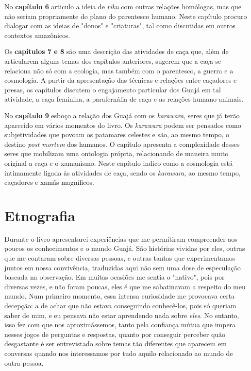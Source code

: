 No \textbf{capítulo 6} articulo a ideia de \emph{riku} com outras relações homólogas, mas que não seriam
propriamente do plano do parentesco humano. Neste capítulo procuro
dialogar com as ideias de "donos" e "criaturas", tal como discutidas em
outros contextos amazônicos.

Os \textbf{capítulos 7 e 8} são uma descrição das atividades de caça
que, além de articularem alguns temas dos capítulos anteriores, sugerem
que a caça se relaciona não só com a ecologia, mas também com o
parentesco, a guerra e a cosmologia. A partir da apresentação das
técnicas e relações entre caçadores e presas, os capítulos discutem o
engajamento particular dos Guajá em tal atividade, a caça feminina, a
parafernália de caça e as relações humano-animais.

No \textbf{capítulo 9} esboço a relação dos Guajá com os
\emph{karawara}, seres que já terão aparecido em vários momentos do
livro. Os \emph{karawara} podem ser pensados como subjetividades que
povoam os patamares celestes e são, ao mesmo tempo, o destino \emph{post
mortem} dos humanos. O capítulo apresenta a complexidade desses seres
que mobilizam uma ontologia própria, relacionando de maneira muito
original a caça e o xamanismo. Neste capítulo indico como a
cosmologia está intimamente ligada às atividades de caça, sendo os
\emph{karawara}, ao mesmo tempo, caçadores e xamãs magníficos.

\section{Etnografia}\label{etnografia}

Durante o livro apresentarei experiências que me permitiram compreender
aos poucos os conhecimentos e o mundo Guajá. São histórias vividas por
eles, outras que me contaram sobre diversas pessoas, e outras tantas que
experimentamos juntos em nossa convivência, traduzidas aqui não sem uma
dose de especulação baseada na observação. Em muitas ocasiões me sentia
o "nativo", pois por diversas vezes, e não foram poucas, eles é que me
sabatinavam a respeito do meu mundo. Num primeiro momento, essa intensa
curiosidade me provocava certa decepção: a de achar que não estava
conseguindo conhecê-los, pois só queriam saber de mim, e eu pensava não
estar aprendendo nada sobre \emph{eles}. No entanto, isso fez com que
nos aproximássemos, tanto pela confiança mútua que impera nesses jogos
de perguntas e respostas, quanto por conseguir perceber quão desgastante
é ser entrevistado sobre temas tão diferentes que aparecem em conversas
quando nos interessamos por tudo aquilo relacionado ao mundo de outra
pessoa.

